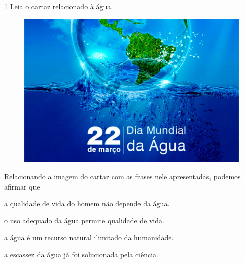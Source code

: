 \num{1} Leia o cartaz relacionado à água.
\begin{figure}[htpb!]
\includegraphics[width=\textwidth]{media/image17.png}
\end{figure}




\pagebreak
Relacionando a imagem do cartaz com as frases nele apresentadas, podemos
afirmar que 

\begin{escolha}
\item a qualidade de vida do homem não depende da água.

\item o uso adequado da água permite qualidade de vida.

\item a água é um recurso natural ilimitado da humanidade.

\item a escassez da água já foi solucionada pela ciência.
\end{escolha}



